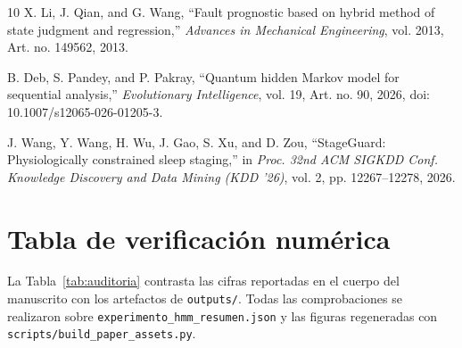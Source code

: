 \documentclass[11pt,letterpaper]{article}
\begin{document}
\begin{thebibliography}{10}
X. Li, J. Qian, and G. Wang, ``Fault prognostic based on hybrid method of state judgment and regression,'' \emph{Advances in Mechanical Engineering}, vol. 2013, Art. no. 149562, 2013.

B. Deb, S. Pandey, and P. Pakray, ``Quantum hidden Markov model for sequential analysis,'' \emph{Evolutionary Intelligence}, vol. 19, Art. no. 90, 2026, doi: 10.1007/s12065-026-01205-3.

J. Wang, Y. Wang, H. Wu, J. Gao, S. Xu, and D. Zou, ``StageGuard: Physiologically constrained sleep staging,'' in \emph{Proc. 32nd ACM SIGKDD Conf. Knowledge Discovery and Data Mining (KDD '26)}, vol. 2, pp. 12267--12278, 2026.

\end{thebibliography}

\appendix
\section{Tabla de verificación numérica}

La Tabla~\ref{tab:auditoria} contrasta las cifras reportadas en el cuerpo del manuscrito con los artefactos de \texttt{outputs/}. Todas las comprobaciones se realizaron sobre \texttt{experimento\_hmm\_resumen.json} y las figuras regeneradas con \texttt{scripts/build\_paper\_assets.py}.
\end{document}

